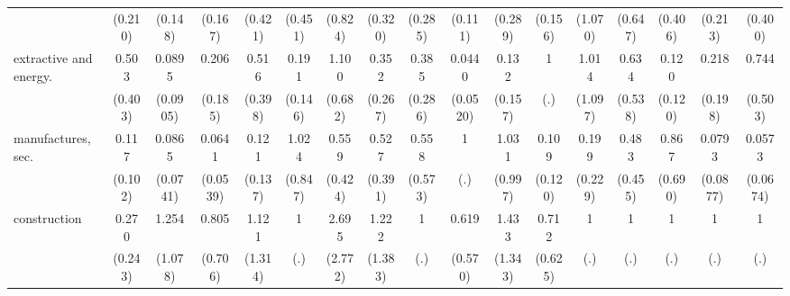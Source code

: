 {\begin{tabular}{l*{16}{c}}
                    &     (0.210)         &     (0.148)         &     (0.167)         &     (0.421)         &     (0.451)         &     (0.824)         &     (0.320)         &     (0.285)         &     (0.111)         &     (0.289)         &     (0.156)         &     (1.070)         &     (0.647)         &     (0.406)         &     (0.213)         &     (0.400)         \\
[1em]
extractive and energy.&       0.503         &      0.0895\sym{*}  &       0.206         &       0.516         &       0.191\sym{*}  &       1.100         &       0.352         &       0.385         &      0.0440\sym{**} &       0.132         &           1         &       1.014         &       0.634         &       0.120\sym{*}  &       0.218         &       0.744         \\
                    &     (0.403)         &    (0.0905)         &     (0.185)         &     (0.398)         &     (0.146)         &     (0.682)         &     (0.267)         &     (0.286)         &    (0.0520)         &     (0.157)         &         (.)         &     (1.097)         &     (0.538)         &     (0.120)         &     (0.198)         &     (0.503)         \\
[1em]
manufactures, sec.  &       0.117\sym{*}  &      0.0865\sym{**} &      0.0641\sym{**} &       0.121         &       1.024         &       0.559         &       0.527         &       0.558         &           1         &       1.031         &       0.109\sym{*}  &       0.199         &       0.483         &       0.867         &      0.0793\sym{*}  &      0.0573\sym{*}  \\
                    &     (0.102)         &    (0.0741)         &    (0.0539)         &     (0.137)         &     (0.847)         &     (0.424)         &     (0.391)         &     (0.573)         &         (.)         &     (0.997)         &     (0.120)         &     (0.229)         &     (0.455)         &     (0.690)         &    (0.0877)         &    (0.0674)         \\
[1em]
construction        &       0.270         &       1.254         &       0.805         &       1.121         &           1         &       2.695         &       1.222         &           1         &       0.619         &       1.433         &       0.712         &           1         &           1         &           1         &           1         &           1         \\
                    &     (0.243)         &     (1.078)         &     (0.706)         &     (1.314)         &         (.)         &     (2.772)         &     (1.383)         &         (.)         &     (0.570)         &     (1.343)         &     (0.625)         &         (.)         &         (.)         &         (.)         &         (.)         &         (.)         \\

\end{tabular}}
